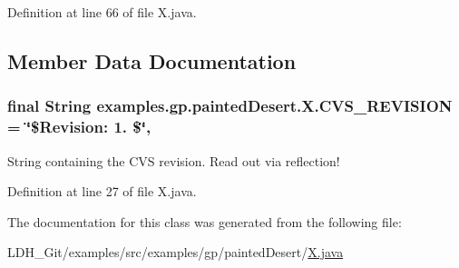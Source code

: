 Definition at line 66 of file X.\-java.



\subsection{Member Data Documentation}
\hypertarget{classexamples_1_1gp_1_1painted_desert_1_1_x_af4f68f41445c8db4de33cd6cdc500a9b}{
\subsubsection[{C\-V\-S\-\_\-\-R\-E\-V\-I\-S\-I\-O\-N}]{\setlength{\rightskip}{0pt plus 5cm}final String examples.\-gp.\-painted\-Desert.\-X.\-C\-V\-S\-\_\-\-R\-E\-V\-I\-S\-I\-O\-N = \char`\"{}\$Revision\-: 1. \$\char`\"{}\hspace{0.3cm}{\ttfamily [static]}, {\ttfamily [private]}}}\label{classexamples_1_1gp_1_1painted_desert_1_1_x_af4f68f41445c8db4de33cd6cdc500a9b}
String containing the C\-V\-S revision. Read out via reflection! 

Definition at line 27 of file X.\-java.



The documentation for this class was generated from the following file\-:\begin{DoxyCompactItemize}
\item 
L\-D\-H\-\_\-\-Git/examples/src/examples/gp/painted\-Desert/\hyperlink{_x_8java}{X.\-java}\end{DoxyCompactItemize}
